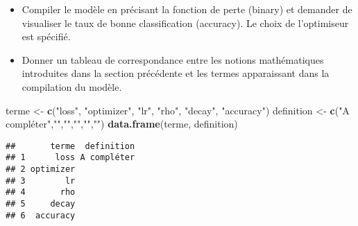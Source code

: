 \documentclass[]{article}
\newenvironment{Shaded}{\begin{snugshade}}{\end{snugshade}}
\newcommand{\KeywordTok}[1]{\textcolor[rgb]{0.13,0.29,0.53}{\textbf{#1}}}
\newcommand{\DataTypeTok}[1]{\textcolor[rgb]{0.13,0.29,0.53}{#1}}
\newcommand{\DecValTok}[1]{\textcolor[rgb]{0.00,0.00,0.81}{#1}}
\newcommand{\FloatTok}[1]{\textcolor[rgb]{0.00,0.00,0.81}{#1}}
\newcommand{\StringTok}[1]{\textcolor[rgb]{0.31,0.60,0.02}{#1}}
\newcommand{\CommentTok}[1]{\textcolor[rgb]{0.56,0.35,0.01}{\textit{#1}}}
\newcommand{\OperatorTok}[1]{\textcolor[rgb]{0.81,0.36,0.00}{\textbf{#1}}}
\newcommand{\NormalTok}[1]{#1}
\providecommand{\tightlist}{%
  \setlength{\itemsep}{0pt}\setlength{\parskip}{0pt}}
\begin{document}
\begin{itemize}
\tightlist
\item
  Compiler le modèle en précisant la fonction de perte (binary) et
  demander de visualiser le taux de bonne classification (accuracy). Le
  choix de l'optimiseur est spécifié.
\end{itemize}

\begin{Shaded}
\end{Shaded}

\begin{itemize}
\tightlist
\item
  Donner un tableau de correspondance entre les notions mathématiques
  introduites dans la section précédente et les termes apparaissant dans
  la compilation du modèle.
\end{itemize}

\begin{Shaded}
\begin{Highlighting}[]
\NormalTok{terme <-}\StringTok{ }\KeywordTok{c}\NormalTok{(}\StringTok{"loss"}\NormalTok{, }\StringTok{"optimizer"}\NormalTok{, }\StringTok{"lr"}\NormalTok{, }\StringTok{"rho"}\NormalTok{, }\StringTok{"decay"}\NormalTok{, }\StringTok{"accuracy"}\NormalTok{)}
\NormalTok{definition <-}\StringTok{ }\KeywordTok{c}\NormalTok{(}\StringTok{"A compléter"}\NormalTok{,}\StringTok{""}\NormalTok{,}\StringTok{""}\NormalTok{,}\StringTok{""}\NormalTok{,}\StringTok{""}\NormalTok{,}\StringTok{""}\NormalTok{)}
\KeywordTok{data.frame}\NormalTok{(terme, definition)}
\end{Highlighting}
\end{Shaded}

\begin{verbatim}
##       terme  definition
## 1      loss A compléter
## 2 optimizer            
## 3        lr            
## 4       rho            
## 5     decay            
## 6  accuracy
\end{verbatim}
\end{document}
